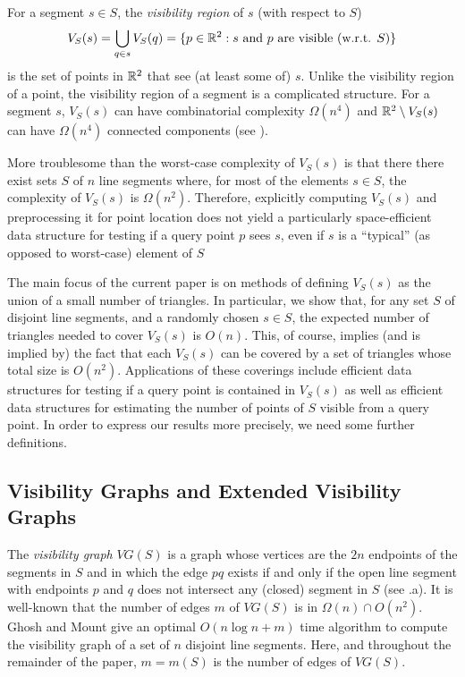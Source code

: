 \documentclass{patmorin}
\newcommand{\VG}{\mathit{VG}}
\begin{document}
For a segment $s\in S$, the \emph{visibility region} of $s$ (with respect
to $S$)
\[
   V_S(s) = \bigcup_{q\in s} V_S(q)
          = \{p\in\mathbb{R}^2:\mbox{$s$ and $p$ are visible (w.r.t. $S$)} \}
\]
is the set of points in $\mathbb{R}^2$ that see (at least some of) $s$.
Unlike the visibility region of a point, the visibility region of a
segment is a complicated structure.  For a segment $s$, $V_S(s)$ can have
combinatorial complexity $\Omega(n^4)$ and $\mathbb{R}^2\setminus V_S(s)$ can
have $\Omega(n^4)$ connected components \cite[Figure~8.13]{o87}\cite[Lemma~12]{fhjmz08} (see ).

More troublesome than the worst-case complexity of $V_S(s)$ is that
there there exist sets $S$ of $n$ line segments where, for most of
the elements $s\in S$, the complexity of $V_S(s)$ is $\Omega(n^2)$.
Therefore, explicitly computing $V_S(s)$ and preprocessing it for point
location does not yield a particularly space-efficient data structure
for testing if a query point $p$ sees $s$, even if $s$ is a ``typical''
(as opposed to worst-case) element of $S$

The main focus of the current paper is on methods of defining $V_S(s)$ as
the union of a small number of triangles.  In particular, we show that,
for any set $S$ of disjoint line segments, and a randomly chosen $s\in
S$, the expected number of triangles needed to cover $V_S(s)$ is $O(n)$.
This, of course, implies (and is implied by) the fact that each $V_S(s)$
can be covered by a set of triangles whose total size is $O(n^2)$.
Applications of these coverings include efficient data structures for
testing if a query point is contained in $V_S(s)$ as well as efficient
data structures for estimating the number of points of $S$ visible from
a query point.  In order to express our results more precisely, we need
some further definitions.

\subsection{Visibility Graphs and Extended Visibility Graphs}

The \emph{visibility graph} $\VG(S)$ is a graph whose vertices are the
$2n$ endpoints of the segments in $S$ and in which the edge $pq$ exists
if and only if the open line segment with endpoints $p$ and $q$ does
not intersect any (closed) segment in $S$ (see .a).  It is
well-known that the number of edges $m$ of $\VG(S)$ is in $\Omega(n)\cap
O(n^2)$.  Ghosh and Mount \cite{gm91} give an optimal $O(n\log n+ m)$
time algorithm to compute the visibility graph of a set of $n$ disjoint
line segments.  Here, and throughout the remainder of the paper, $m=m(S)$
is the number of edges of $\VG(S)$.
\end{document}

